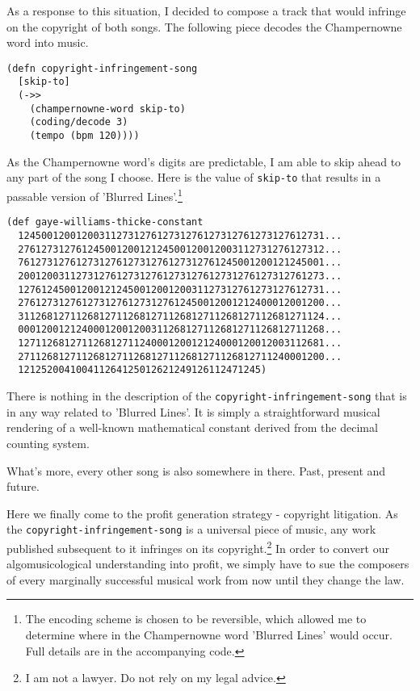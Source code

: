\documentclass[numbers]{sigplanconf}
\begin{document}
As a response to this situation, I decided to compose a track that would infringe on the copyright of both songs. The following
piece decodes the Champernowne word into music.

\begin{verbatim}
(defn copyright-infringement-song
  [skip-to]
  (->>
    (champernowne-word skip-to)
    (coding/decode 3)
    (tempo (bpm 120))))
\end{verbatim}

As the Champernowne word's digits are predictable, I am able to skip ahead to any part of the song I choose. Here
is the value of \verb|skip-to| that results in a passable version of 'Blurred Lines'.\footnote{The encoding scheme is chosen
to be reversible, which allowed me to determine where in the Champernowne word 'Blurred Lines' would occur. Full details are in the accompanying code.}

\begin{verbatim}
(def gaye-williams-thicke-constant
  12450012001200311273127612731276127312761273127612731...
  27612731276124500120012124500120012003112731276127312...
  76127312761273127612731276127312761245001200121245001...
  20012003112731276127312761273127612731276127312761273...
  12761245001200121245001200120031127312761273127612731...
  27612731276127312761273127612450012001212400012001200...
  31126812711268127112681271126812711268127112681271124...
  00012001212400012001200311268127112681271126812711268...
  12711268127112681271124000120012124000120012003112681...
  27112681271126812711268127112681271126812711240001200...
  121252004100411264125012621249126112471245)
\end{verbatim}

There is nothing in the description of the \verb|copyright-infringement-song| that is in any way related to 'Blurred Lines'.
It is simply a straightforward musical rendering of a well-known mathematical constant derived from the decimal counting
system.

What's more, every other song is also somewhere in there. Past, present and future.

Here we finally come to the profit generation strategy - copyright litigation. As the \verb|copyright-infringement-song| is
a universal piece of music, any work published subsequent to it infringes on its copyright.\footnote{I am not a lawyer. Do not rely on my legal advice.} In order to convert our algomusicological understanding into profit, we simply have to sue the composers
of every marginally successful musical work from now until they change the law.
\end{document}
